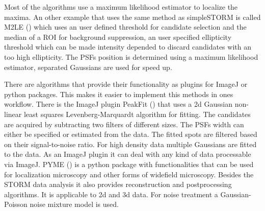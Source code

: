 Most of the algorithms use a maximum likelihood estimator to localize the maxima. An other example that uses the same method as simpleSTORM is called M2LE (\cite{M2LE}) which uses an user defined threshold for candidate selection and the median of a ROI for background suppression, an user specified ellipticity threshold which can be made intensity depended to discard candidates with an too high ellipticity. The PSFs position is determined using a maximum likelihood estimator, separated Gaussians are used for speed up. \newline

There are algorithms that provide their functionality as plugins for ImageJ or python packages. This makes it easier to implement this methods in ones workflow.\newline
There is the ImageJ plugin PeakFit (\cite{peakFit}) that uses a 2d Gaussian non-linear least squares Levenberg-Marquardt algorithm for fitting. The candidates are acquired by subtracting two filters of different sizes. The PSFs width can either be specified or estimated from the data. The fitted spots are filtered based on their signal-to-noise ratio. For high density data multiple Gaussians are fitted to the data. As an ImageJ plugin it can deal with any kind of data processable via ImageJ.\newline
PYME (\cite{PYME}) is a python package with functionalities that can be used for localization microscopy and other forms of widefield microscopy. Besides the STORM data analysis it also provides reconstruction and postprocessing algorithms. It is applicable to 2d and 3d data. For noise treatment a Gaussian-Poisson noise mixture model is used.\newline

